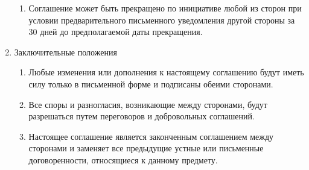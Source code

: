 \documentclass[a4paper, 14pt] {extarticle}
\begin{document}
\begin{enumerate}
\begin{enumerate}
	\item Соглашение может быть прекращено по инициативе любой из сторон при условии предварительного письменного уведомления другой стороны за 30 дней до предполагаемой даты прекращения.
	\end{enumerate}
\item Заключительные положения
	\begin{enumerate}
	\item Любые изменения или дополнения к настоящему соглашению будут иметь силу только в письменной форме и подписаны обеими сторонами.
	\item Все споры и разногласия, возникающие между сторонами, будут разрешаться путем переговоров и добровольных соглашений.
	\item Настоящее соглашение является законченным соглашением между сторонами и заменяет все предыдущие устные или письменные договоренности, относящиеся к данному предмету.
	\end{enumerate}
\end{enumerate}
\end{document}
